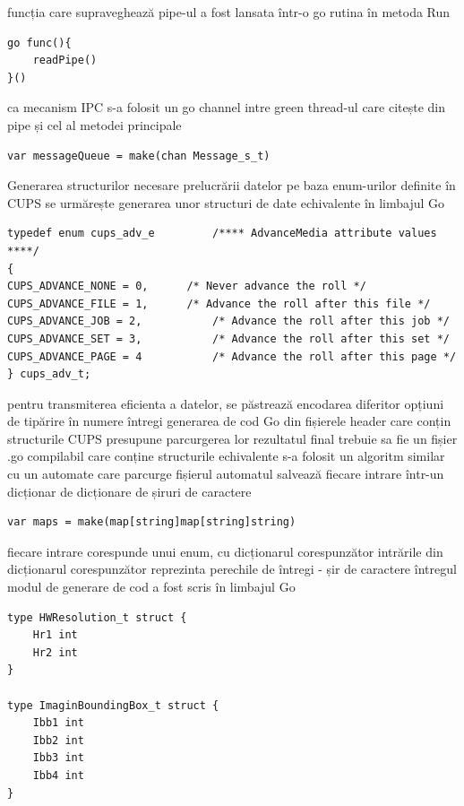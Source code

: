 \documentclass[a4paper, 12pt, twoside]{report}
\begin{document}
\begin{outline}
	\2 funcția care supraveghează pipe-ul a fost lansata într-o go rutina în metoda Run
\begin{lstlisting}[caption={apel readPipe in go routina separata - golang},captionpos=b]
go func(){
	readPipe()
}()
\end{lstlisting}
	\2 ca mecanism IPC s-a folosit un go channel intre green thread-ul care citește din pipe și cel al metodei principale
\begin{lstlisting}[caption={instantiere canal - golang},captionpos=b]
var messageQueue = make(chan Message_s_t)
\end{lstlisting}

\1 {\large Generarea structurilor necesare prelucrării datelor}
	\2 pe baza enum-urilor definite în CUPS se urmărește generarea unor structuri de date echivalente în limbajul Go
\begin{lstlisting}[caption={exemplu enum CUPS - C},captionpos=b]
typedef enum cups_adv_e			/**** AdvanceMedia attribute values ****/
{
CUPS_ADVANCE_NONE = 0,		/* Never advance the roll */
CUPS_ADVANCE_FILE = 1,		/* Advance the roll after this file */
CUPS_ADVANCE_JOB = 2,			/* Advance the roll after this job */
CUPS_ADVANCE_SET = 3,			/* Advance the roll after this set */
CUPS_ADVANCE_PAGE = 4			/* Advance the roll after this page */
} cups_adv_t;

\end{lstlisting}
	\2 pentru transmiterea eficienta a datelor, se păstrează encodarea diferitor opțiuni de tipărire în numere întregi
	\2 generarea de cod Go din fișierele header care conțin structurile CUPS presupune parcurgerea lor
	\2 rezultatul final trebuie sa fie un fișier .go compilabil care conține structurile echivalente
	\2 s-a folosit un algoritm similar cu un automate care parcurge fișierul
	\2 automatul salvează fiecare intrare într-un dicționar de dicționare de șiruri de caractere
\begin{lstlisting}[caption={instantiere dictionar - golang},captionpos=b]
var maps = make(map[string]map[string]string)
\end{lstlisting}
	\2 fiecare intrare corespunde unui enum, cu dicționarul corespunzător
	\2 intrările din dicționarul corespunzător reprezinta perechile de întregi - șir de caractere
	\2 întregul modul de generare de cod a fost scris în limbajul Go
\begin{lstlisting}[caption={structuri de date pentru generator/procesor date - golang},captionpos=b]
type HWResolution_t struct {
	Hr1 int
	Hr2 int
}

type ImaginBoundingBox_t struct {
	Ibb1 int
	Ibb2 int
	Ibb3 int
	Ibb4 int
}


\end{lstlisting}
\end{outline}
\end{document}

